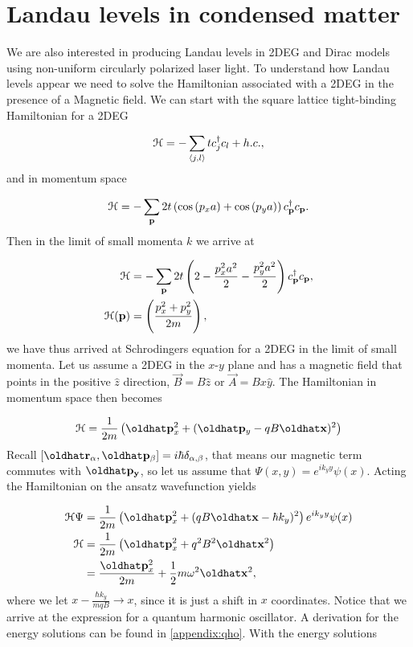 \section{Landau levels in condensed matter}

We are also interested in producing Landau levels in 2DEG and Dirac models using non-uniform circularly polarized laser light.
To understand how Landau levels appear we need to solve the Hamiltonian associated with a 2DEG in the presence of a Magnetic field.
We can start with the square lattice tight-binding Hamiltonian for a 2DEG

\begin{equation}
  \mathcal{H} = -\sum_{\langle j,l \rangle} tc^{\dagger}_j c_{l} + h.c.,
\end{equation}
and in momentum space

\begin{equation}
  \mathcal{H} = -\sum_{\mathbf{p}} 2t \left( \cos{(p_x a)} + \cos{(p_y a)} \right) c^{\dagger}_{\mathbf{p}} c_{\mathbf{p}}.
\end{equation}
Then in the limit of small momenta $k$ we arrive at

\begin{align}
  \mathcal{H} &= -\sum_{\mathbf{p}} 2t \left( 2 - \dfrac{p_x^2a^2}{2} -\dfrac{p_y^2a^2}{2} \right) c^{\dagger}_{\mathbf{p}} c_{\mathbf{p}}, \nonumber \\
  \mathcal{H}(\mathbf{p}) &= \left(\dfrac{p_x^2 + p_y^2}{2m}\right),
\end{align}
we have thus arrived at Schrodingers equation for a 2DEG in the limit of small momenta.
Let us assume a 2DEG in the $x$-$y$ plane and has a magnetic field that points in the positive $\hat{z}$ direction, $\vec{B} = B\hat{z}$ or $\vec{A} = Bx\hat{y}$.
The Hamiltonian in momentum space then becomes

\begin{equation}
  \ham = \dfrac{1}{2m} \left( \op{p}_x^2 + (\op{p}_y - qB \op{x})^2 \right)
\end{equation}
Recall $[\op{r}_{\alpha}, \op{p}_{\beta}] = i\hbar \delta_{\alpha,\beta}$, that means our magnetic term commutes with $\op{p_y}$, so let us assume that $\Psi(x,y) = e^{ik_y y} \psi(x)$.
Acting the Hamiltonian on the ansatz wavefunction yields

\begin{align}
  \ham\Psi &= \dfrac{1}{2m} \left( \op{p}_x^2 + (qB \op{x} - \hbar k_y)^2 \right)e^{ik_y y} \psi(x) \nonumber \\
  \ham & = \dfrac{1}{2m} \left( \op{p}_x^2 + q^2 B^2 \op{x}^2 \right) \nonumber \\
  &= \dfrac{\op{p}_x^2}{2m} + \dfrac{1}{2} m \omega^2 \op{x}^2,
\end{align}
where we let $x - \tfrac{\hbar k_y}{mqB} \rightarrow x$, since it is just a shift in $x$ coordinates.
Notice that we arrive at the expression for a quantum harmonic oscillator.
A derivation for the energy solutions can be found in \ref{appendix:qho}.
With the energy solutions

